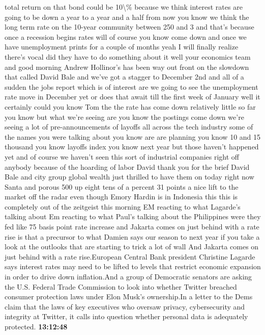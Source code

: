 \documentclass{article}%
\begin{document}
total return on that bond could be 10\textbackslash{}\% because we think interest rates are going to be down a year to a year and a half from now you know we think the long term rate on the 10{-}year community between 250 and 3 and that's because once a recession begins rates will of course you know come down and once we have unemployment prints for a couple of months yeah I will finally realize there's vocal did they have to do something about it well your economics team and good morning Andrew Hollinor's has been way out front on the slowdown that called David Bale and we've got a stagger to December 2nd and all of a sudden the jobs report which is of interest are we going to see the unemployment rate move in December yet or does that await till the first week of January well it certainly could you know Tom the the rate has come down relatively little so far you know but what we're seeing are you know the postings come down we're seeing a lot of pre{-}announcements of layoffs all across the tech industry some of the names you were talking about you know are are planning you know 10 and 15 thousand you know layoffs index you know next year but those haven't happened yet and of course we haven't seen this sort of industrial companies right off anybody because of the hoarding of labor David thank you for the brief David Bale and city group global wealth just thrilled to have them on today right now Santa and porous 500 up eight tens of a percent 31 points a nice lift to the market off the radar even though Emory Hardin is in Indonesia this this is completely out of the zeitgeist this morning EM reacting to what Lagarde's talking about Em reacting to what Paul's talking about the Philippines were they fed like 75 basis point rate increase and Jakarta comes on just behind with a rate rise is that a precursor to what Damien says our season to next year if you take a look at the outlooks that are starting to trick a lot of wall  And Jakarta comes on just behind with a rate rise.European Central Bank president Christine Lagarde says interest rates may need to be lifted to levels that restrict economic expansion in order to drive down inflation.And a group of Democratic senators are asking the U.S. Federal Trade Commission to look into whether Twitter breached consumer protection laws under Elon Musk's ownership.In a letter to the Dems claim that the laws of key executives who oversaw privacy, cybersecurity and integrity at Twitter, it calls into question whether personal data is adequately protected.%
\textbf{13:12:48}%
\newline%
\end{document}
